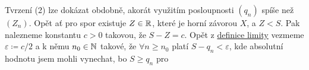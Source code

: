 \begin{propproof}
 Tvrzení (2) lze dokázat obdobně, akorát využitím posloupnosti $(q_n)$ spíše než
 $(Z_n)$. Opět ať pro spor existuje $Z \in \mathbb{R}$, které je horní závorou $X$, a $Z
 < S$. Pak nalezneme konstantu $c > 0$ takovou, že $S - Z = c$. Opět z
 \hyperref[def:limita-posloupnosti]{definice limity} vezmeme $\varepsilon
 \coloneqq c / 2$ a k němu $n_0 \in \mathbb{N}$ takové, že $\forall n \geq n_0$ platí $S
 - q_n < \varepsilon$, kde absolutní hodnotu jsem mohli vynechat, bo $S \geq
 q_n$ pro 
\end{propproof}
